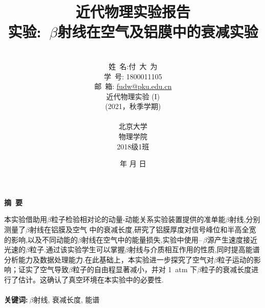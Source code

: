 \documentclass[a4paper]{article}
\begin{document}
\renewcommand{\contentsname}{目\ 录}
\renewcommand{\appendixname}{附录}
\renewcommand{\appendixpagename}{附录}
\renewcommand{\refname}{参考文献} 
\renewcommand{\figurename}{图}
\renewcommand{\tablename}{表}
\renewcommand{\today}{\number\year 年 \number\month 月 \number\day 日}

\newcommand*{\circled}[1]{\lower.7ex\hbox{\tikz\draw (0pt, 0pt)%
    circle (.5em) node {\makebox[1em][c]{\small #1}};}}
\title{{\Huge 近代物理实验报告{\large\linebreak\\}}{\Large 实验:\ $\beta$射线在空气及铝膜中的衰减实验\linebreak\linebreak}}
\author{\\姓\ 名:付\ 大\ 为\\
学\ 号: 1800011105\\
邮\ 箱: \url{fudw@pku.edu.cn}\\
近代物理实验 (I)\\
(2021，秋季学期)\\\\
北京大学\\
物理学院\\
2018级1班}
\date{\today}
\maketitle
\newpage

\begin{center}
{\Large\bf{摘\ 要\\}}
\end{center}

本实验借助用$\beta$粒子检验相对论的动量-动能关系实验装置提供的准单能$\beta$射线,分别测量了$\beta$射线在铝膜及空气
中的衰减长度,研究了铝膜厚度对信号峰位和半高全宽的影响,以及不同动能的$\beta$射线在空气中的能量损失,实验中使用\SrAtom--\Yatom\,$\beta$源产生速度接近光速的$\beta$粒子.通过该实验学生可以掌握$\beta$射线与介质相互作用的性质,同时提高能谱分析能力及数据处理能力.在此基础上，本实验进一步探究了空气对$\beta$粒子运动的影响；证实了空气导致$\beta$粒子的自由程显著减小，并对 \SI{1}{atm} 下$\beta$粒子的衰减长度进行了估计。这确认了真空环境在本实验中的必要性.\\\\
{\bf{关键词}:}$\ \beta$射线, 衰减长度, 能谱
\newpage
\end{document}
